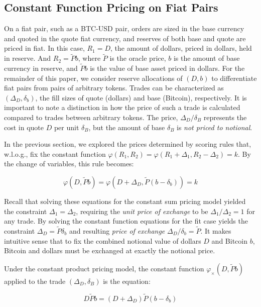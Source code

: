 \documentclass{article}
\begin{document}
\subsection{Constant Function Pricing on Fiat Pairs}

On a fiat pair, such as a BTC-USD pair, orders are sized in the base currency and quoted in the quote fiat currency, and reserves of both base and quote are priced in fiat. In this case, $R_1 = D$, the amount of dollars, priced in dollars, held in reserve. And $R_2 = \tilde{P} b$, where $\tilde{P}$ is the oracle price, $b$ is the amount of base currency in reserve, and $\tilde{P} b$ is the value of base asset priced in dollars. For the remainder of this paper, we consider reserve allocations of $(D, b)$ to differentiate fiat pairs from pairs of arbitrary tokens. Trades can be characterized as $(\Delta_D, \delta_b)$, the fill sizes of quote (dollars) and base (Bitcoin), respectively. It is important to note a distinction in how the price of such a trade is calculated compared to trades between arbitrary tokens. The price, $\Delta_D / \delta_B$ represents the cost in quote $D$ per unit $\delta_B$, but the amount of base $\delta_B$ is \emph{not priced to notional}.

In the previous section, we explored the prices determined by scoring rules that, w.l.o.g., fix the constant function $\varphi(R_1, R_2) = \varphi(R_1 + \Delta_1, R_2 - \Delta_2) = k$. By the change of variables, this rule becomes:

\begin{equation}
\varphi(D, \tilde{P}b) = \varphi(D + \Delta_D, \tilde{P}(b - \delta_b)) = k
\end{equation}

Recall that solving these equations for the constant sum pricing model yielded the constraint $\Delta_1 = \Delta_2$, requiring the \emph{unit price of exchange} to be $\Delta_1 / \Delta_2 = 1$ for any trade. By solving the constant function equations for the fit case yields the constraint $\Delta_D = \tilde{P} \delta_b$ and resulting \emph{price of exchange} $\Delta_D / \delta_b = \tilde{P}$. It makes intuitive sense that to fix the combined notional value of dollars $D$ and Bitcoin $b$, Bitcoin and dollars must be exchanged at exactly the notional price.

Under the constant product pricing model, the constant function $\varphi_{\times}(D, \tilde{P}b)$ applied to the trade $(\Delta_D, \delta_B)$ is the equation:

\begin{equation}
D \tilde{P} b = (D + \Delta_D) \tilde{P} (b - \delta_b)
\end{equation}
\end{document}
